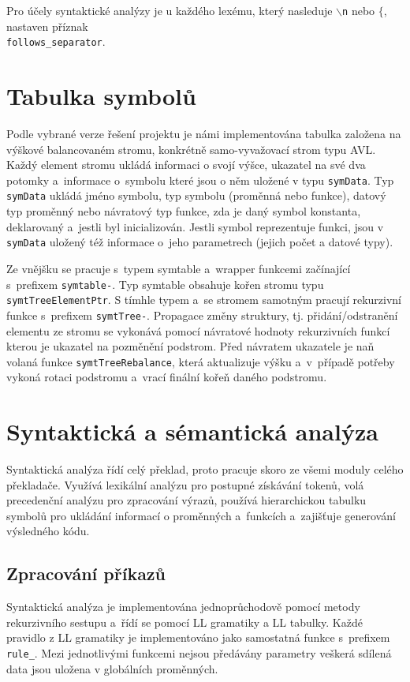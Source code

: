 \documentclass[11spt]{article}
\begin{document}
Pro účely syntaktické analýzy je u každého lexému, který nasleduje \texttt{$\backslash$n} nebo \texttt{$\{$}, nastaven příznak\\ \texttt{follows\_separator}.







\section{Tabulka symbolů}
Podle vybrané verze řešení projektu je námi implementována tabulka založena na výškové balancovaném stromu,
konkrétně samo-vyvažovací strom typu AVL. Každý element stromu ukládá informaci o svojí výšce, ukazatel na své dva potomky a~informace
o~symbolu které jsou o něm uložené v typu \texttt{symData}. Typ \texttt{symData} ukládá jméno symbolu, typ symbolu (proměnná nebo funkce),
datový typ proměnný nebo návratový typ funkce, zda je daný symbol konstanta, deklarovaný a~jestli byl inicializován.
Jestli symbol reprezentuje funkci, jsou v \texttt{symData} uložený též informace o~jeho parametrech (jejich počet a datové typy).

Ze vnějšku se pracuje s~typem symtable a~wrapper funkcemi začínající s~prefixem \texttt{symtable-}.
Typ symtable obsahuje kořen stromu typu \texttt{symtTreeElementPtr}. S tímhle typem a~se 
stromem samotným pracují rekurzivní funkce s~prefixem \texttt{symtTree-}.
Propagace změny struktury, tj. přidání/odstranění elementu ze stromu se vykonává pomocí návratové
hodnoty rekurzivních funkcí kterou je ukazatel na pozměnění podstrom.
Před návratem ukazatele je naň volaná funkce \texttt{symtTreeRebalance}, která aktualizuje výšku a~v~případě
potřeby vykoná rotaci podstromu a~vrací finální kořeň daného podstromu.

\section{Syntaktická a sémantická analýza}
Syntaktická analýza řídí celý překlad, proto pracuje skoro ze všemi moduly celého překladače.
Využívá lexikální analýzu pro postupné získávání tokenů, volá precedenční analýzu pro zpracování
výrazů, používá hierarchickou tabulku symbolů pro ukládání informací o proměnných a~funkcích a~zajišťuje generování výsledného kódu.


\subsection{Zpracování příkazů}
Syntaktická analýza je implementována jednoprůchodově pomocí metody rekurzivního sestupu
a~řídí se pomocí LL gramatiky a LL tabulky. Každé pravidlo z LL gramatiky je implementováno
jako samostatná funkce s~prefixem \texttt{rule\_}. 
Mezi jednotlivými funkcemi nejsou předávány parametry veškerá sdílená data jsou uložena v globálních proměnných.
\end{document}
